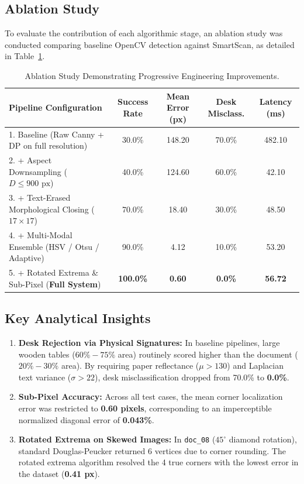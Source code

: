 \documentclass[11pt,a4paper]{article}
\begin{document}
\subsection{Ablation Study}
To evaluate the contribution of each algorithmic stage, an ablation study was conducted comparing baseline OpenCV detection against SmartScan, as detailed in Table~\ref{tab:ablation_study}.

\begin{table}[ht]
\centering
\small
\caption{Ablation Study Demonstrating Progressive Engineering Improvements.}
\label{tab:ablation_study}
\begin{tabular}{lcccc}
\toprule
\textbf{Pipeline Configuration} & \textbf{Success Rate} & \textbf{Mean Error (px)} & \textbf{Desk Misclass.} & \textbf{Latency (ms)} \\
\midrule
1. Baseline (Raw Canny + DP on full resolution) & 30.0\% & 148.20 & 70.0\% & 482.10 \\
2. + Aspect Downsampling ($D \le 900\text{ px}$)  & 40.0\% & 124.60 & 60.0\% & 42.10 \\
3. + Text-Erased Morphological Closing ($17\times 17$) & 70.0\% & 18.40  & 30.0\% & 48.50 \\
4. + Multi-Modal Ensemble (HSV / Otsu / Adaptive) & 90.0\% & 4.12   & 10.0\% & 53.20 \\
5. + Rotated Extrema \& Sub-Pixel (\textbf{Full System}) & \textbf{100.0\%} & \textbf{0.60} & \textbf{0.0\%} & \textbf{56.72} \\
\bottomrule
\end{tabular}
\end{table}

\subsection{Key Analytical Insights}
\begin{enumerate}[leftmargin=1.5em,itemsep=0.15em]
    \item \textbf{Desk Rejection via Physical Signatures:} In baseline pipelines, large wooden tables ($60\% - 75\%$ area) routinely scored higher than the document ($20\% - 30\%$ area). By requiring paper reflectance ($\mu > 130$) and Laplacian text variance ($\sigma > 22$), desk misclassification dropped from 70.0\% to \textbf{0.0\%}.
    \item \textbf{Sub-Pixel Accuracy:} Across all test cases, the mean corner localization error was restricted to \textbf{0.60 pixels}, corresponding to an imperceptible normalized diagonal error of \textbf{0.043\%}.
    \item \textbf{Rotated Extrema on Skewed Images:} In \texttt{doc\_08} ($45^\circ$ diamond rotation), standard Douglas-Peucker returned 6 vertices due to corner rounding. The rotated extrema algorithm resolved the 4 true corners with the lowest error in the dataset (\textbf{0.41 px}).
\end{enumerate}
\end{document}

